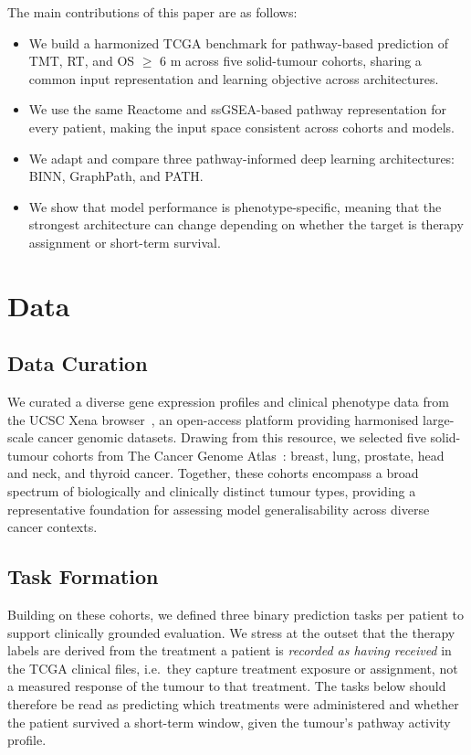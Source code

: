\documentclass[sigconf]{acmart}
\begin{document}
The main contributions of this paper are as follows:
\begin{itemize}[leftmargin=*]
  \item We build a harmonized TCGA benchmark for pathway-based prediction of
  TMT, RT, and OS $\geq$ 6 m across five solid-tumour cohorts, sharing a
  common input representation and learning objective across architectures.
  \item We use the same Reactome and ssGSEA-based pathway representation for
  every patient, making the input space consistent across cohorts and models.
  \item We adapt and compare three pathway-informed deep learning
  architectures: BINN, GraphPath, and PATH.
  \item We show that model performance is phenotype-specific, meaning that
  the strongest architecture can change depending on whether the target is
  therapy assignment or short-term survival.
\end{itemize}


\section{Data}

\subsection{Data Curation}

We curated a diverse gene expression profiles and clinical phenotype data
from the UCSC Xena browser~\cite{xena2020}, an open-access platform
providing harmonised large-scale cancer genomic datasets. Drawing from
this resource, we selected five solid-tumour cohorts from The Cancer
Genome Atlas~\cite{Weinstein2013,tcga2012brca}: breast, lung, prostate, head and neck,
and thyroid cancer. Together, these cohorts encompass a broad spectrum of
biologically and clinically distinct tumour types, providing a
representative foundation for assessing model generalisability across
diverse cancer contexts.

\subsection{Task Formation}
Building on these cohorts, we defined three binary prediction tasks per
patient to support clinically grounded evaluation. We stress at the outset
that the therapy labels are derived from the treatment a patient is
\emph{recorded as having received} in the TCGA clinical files, i.e.\ they
capture treatment exposure or assignment, not a measured response of the
tumour to that treatment. The tasks below should therefore be read as
predicting which treatments were administered and whether the patient
survived a short-term window, given the tumour's pathway activity profile.
\end{document}
